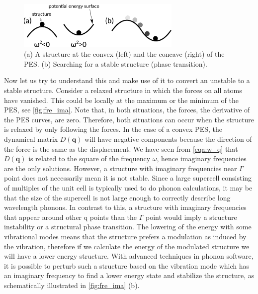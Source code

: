 \begin{figure}[htb] 
\centering  
\includegraphics[width=0.7\textwidth]{fre_ima.eps}
\caption[A structure at the convex and the concave of the PES]{ (a) A structure at the convex (left) and the concave (right) of the PES. (b) Searching for a stable structure (phase transition).}  
\label{fig:fre_ima}
\end{figure} 

Now let us try to understand this and make use of it to convert an unstable to a stable structure. Consider a relaxed structure in which the forces on all atoms have vanished. This could be locally at the maximum or the minimum of the PES, see \autoref{fig:fre_ima}. Note that, in both situations, the forces, the derivative of the PES curves, are zero. Therefore, both situations can occur when the structure is relaxed by only following the forces. In the case of a convex PES, the dynamical matrix $D(\mathbf{q})$ will have negative components because the direction of the force is the same as the displacement. We have seen from \autoref{eqa:w_q} that $D(\mathbf{q})$ is related to the square of the frequency $\omega$, hence imaginary frequencies are the only solutions. However, a structure with imaginary frequencies near $\Gamma$ point does not necessarily mean it is not stable. Since a large supercell consisting of multiples of the unit cell is typically used to do phonon calculations, it may be that the size of the supercell is not large enough to correctly describe long wavelength phonons. In contrast to this, a structure with imaginary frequencies that appear around other q points than the $\Gamma$ point would imply a structure instability or a structural phase transition. The lowering of the energy with some vibrational modes means that the structure prefers a modulation as induced by the vibration, therefore if we calculate the energy of the modulated structure we will have a lower energy structure. With advanced techniques in phonon software\cite[e.g.][]{phonopya}, it is possible to perturb such a structure based on the vibration mode which has an imaginary frequency to find a lower energy state and stabilize the structure, as schematically illustrated in \autoref{fig:fre_ima} (b). 



